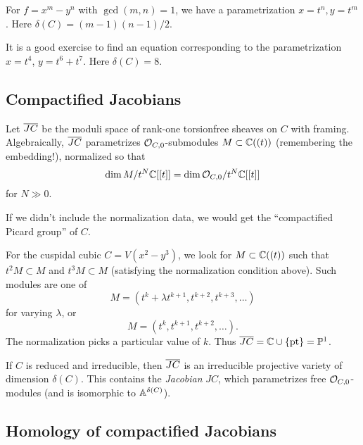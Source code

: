 \documentclass{article}
\begin{document}
\begin{ex}
	For $f = x^m - y^n$ with $\gcd(m, n) = 1$, we have a parametrization $x = t^n, y = t^m$.
	Here $\delta(C) = (m - 1) (n - 1) / 2$.
\end{ex}

\begin{ex}
	It is a good exercise to find an equation corresponding to the parametrization $x = t^4$, $y = t^6 + t^7$.
	Here $\delta(C) = 8$.
\end{ex}

\subsection{Compactified Jacobians}

\begin{dfn}
	Let $\ol{JC}$ be the moduli space of rank-one torsionfree sheaves on $C$ with framing.
	Algebraically, $\ol{JC}$ parametrizes $\Oc_{C,0}$-submodules $M \subset \CC((t))$ (remembering the embedding!), normalized so that
	\[
		\dim M / t^N \CC[[t]] = \dim \Oc_{C,0} / t^N \CC[[t]]
	\]
	for $N \gg 0$.
\end{dfn}

If we didn't include the normalization data, we would get the ``compactified Picard group'' of $C$.

\begin{ex}
	For the cuspidal cubic $C = V(x^2 - y^3)$, we look for $M \subset \CC((t))$ such that $t^2 M \subset M$ and $t^3 M \subset M$ (satisfying the normalization condition above).
	Such modules are one of
	\[
		M = (t^k + \lambda t^{k+1}, t^{k+2}, t^{k+3}, \dots)
	\]
	for varying $\lambda$, or
	\[
		M = (t^k, t^{k+1}, t^{k+2}, \dots).
	\]
	The normalization picks a particular value of $k$.
	Thus $\ol{JC} = \CC \cup \{ \pt \} = \PP^1$.
\end{ex}

\begin{thm}
	If $C$ is reduced and irreducible, then $\ol{JC}$ is an irreducible projective variety of dimension $\delta(C)$.
	This contains the \emph{Jacobian} $JC$, which parametrizes free $\Oc_{C,0}$-modules (and is isomorphic to $\AA^{\delta(C)}$).
\end{thm}

\subsection{Homology of compactified Jacobians}
\end{document}
